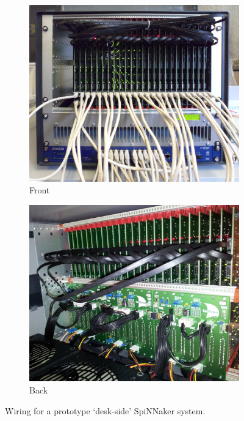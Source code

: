 			\begin{figure}
				\begin{subfigure}{0.49\textwidth}
					\includegraphics[width=\textwidth]{figures/rack-front.jpg}
					
					\caption{Front}
					\label{fig:rack-front}
				\end{subfigure}
				\begin{subfigure}{0.49\textwidth}
					\includegraphics[width=\textwidth]{figures/rack-back.jpg}
					
					\caption{Back}
					\label{fig:rack-back}
				\end{subfigure}
				
				\caption{Wiring for a prototype `desk-side' SpiNNaker system.}
				\label{fig:rack}
			\end{figure}
			

